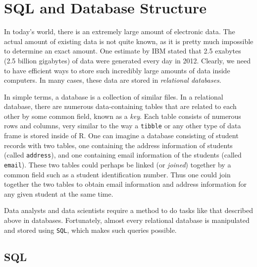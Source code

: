 \documentclass[
]{krantz}
\begin{document}
\hypertarget{sql-and-database-structure}{%
\section{SQL and Database Structure}\label{sql-and-database-structure}}

In today's world, there is an extremely large amount of electronic data. The actual amount of existing data is not quite known, as it is pretty much impossible to determine an exact amount. One estimate by IBM stated that 2.5 exabytes (2.5 billion gigabytes) of data were generated every day in 2012. Clearly, we need to have efficient ways to store such incredibly large amounts of data inside computers. In many cases, these data are stored in \emph{relational databases}.

In simple terms, a database is a collection of similar files. In a relational database, there are numerous data-containing tables that are related to each other by some common field, known as a \emph{key}. Each table consists of numerous rows and columns, very similar to the way a \texttt{tibble} or any other type of data frame is stored inside of R. One can imagine a database consisting of student records with two tables, one containing the address information of students (called \texttt{address}), and one containing email information of the students (called \texttt{email}). These two tables could perhaps be linked (or \emph{joined}) together by a common field such as a student identification number. Thus one could join together the two tables to obtain email information and address information for any given student at the same time.

Data analysts and data scientists require a method to do tasks like that described above in databases. Fortunately, almost every relational database is manipulated and stored using \texttt{SQL}, which makes such queries possible.

\hypertarget{sql}{%
\subsection{SQL}\label{sql}}
\end{document}
